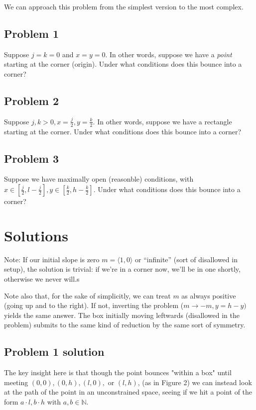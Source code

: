 \documentclass[11pt, oneside]{article} 	%
\begin{document}
We can approach this problem from the simplest version to the most complex.

\subsection{Problem 1} 

Suppose $j = k = 0$ and $x = y = 0$. In other words, suppose we have a \emph{point} starting at the corner
 (origin).  Under what conditions does this bounce into a corner?


\subsection{Problem 2} 

Suppose $j, k > 0, x = \frac{j}{2}, y = \frac{k}{2}$. In other words, suppose we have a rectangle starting at the corner. Under what conditions does this bounce into a corner?

\subsection{Problem 3} 

Suppose we have maximally open (reasonble) conditions, with $x \in [\frac{j}{2}, l - \frac{j}{2}], y \in [\frac{k}{2}, h - \frac{k}{2}]$. Under what conditions does this bounce into a corner?


\section{Solutions}

Note: If our initial slope is zero $m = \langle 1, 0 \rangle$ or ``infinite'' (sort of disallowed in setup), the solution is trivial: if we're in a corner now, we'll be in one shortly, otherwise we never will.s

Note also that, for the sake of simplicitly, we can treat $m$ as always positive (going up and to the right).  If not, inverting the problem ($m \rightarrow -m, y = h - y)$ yields the same answer.  The box initially moving leftwards (disallowed in the problem) submits to the same kind of reduction by the same sort of symmetry.

\subsection{Problem 1 solution}

The key insight here is that though the point bounces "within a box" until meeting $(0,0), (0, h), (l, 0), $ or $(l, h)$, (as in Figure 2) we can instead look at the path of the point in an unconstrained space, seeing if we hit a point of the form $a \cdot l, b \cdot h$ with $a,b \in \mathbb{N}$.
\end{document}
